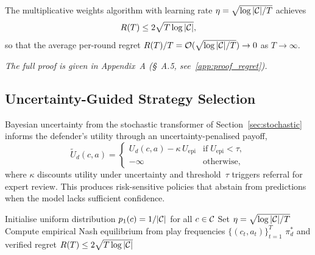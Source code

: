 \begin{theorem}
\label{thm:regret}
The multiplicative weights algorithm with learning rate $\eta=\sqrt{\log|\mathcal{C}|/T}$ achieves
\begin{equation}
R(T)\le 2\sqrt{T\log|\mathcal{C}|},
\label{eq:game_regret_bound}
\end{equation}
so that the average per-round regret $R(T)/T=\mathcal{O}(\sqrt{\log|\mathcal{C}|/T})\to 0$ as $T\to\infty$.
\end{theorem}

\noindent\textit{The full proof is given in Appendix~A (\S~A.5, see~\ref{app:proof_regret}).}

\subsection{Uncertainty-Guided Strategy Selection}

Bayesian uncertainty from the stochastic transformer of Section~\ref{sec:stochastic} informs the defender's utility through an uncertainty-penalised payoff,
\begin{equation}
\tilde{U}_d(c,a)
= \begin{cases}
U_d(c,a) - \kappa\,U_{\mathrm{epi}} & \text{if}\;U_{\mathrm{epi}}<\tau,\\
-\infty & \text{otherwise},
\end{cases}
\label{eq:game_unc}
\end{equation}
where $\kappa$ discounts utility under uncertainty and threshold~$\tau$ triggers referral for expert review. This produces risk-sensitive policies that abstain from predictions when the model lacks sufficient confidence.

\begin{algorithm}[htbp]
\caption{Game-Theoretic Robustness with Uncertainty-Guided Online Learning}\label{alg:game}
Initialise uniform distribution $p_1(c) = 1/|\mathcal{C}|$ for all $c\in\mathcal{C}$\;
Set $\eta = \sqrt{\log|\mathcal{C}|/T}$\;
Compute empirical Nash equilibrium from play frequencies $\{(c_t,a_t)\}_{t=1}^T$\;
\Return $\pi_d^*$ and verified regret $R(T)\le 2\sqrt{T\log|\mathcal{C}|}$
\end{algorithm}

